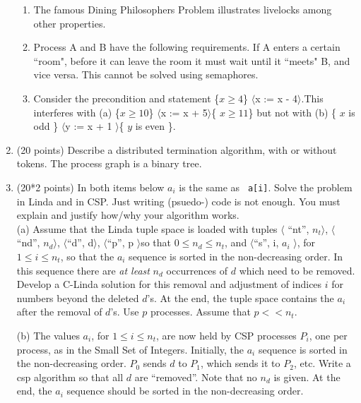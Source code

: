 \documentclass[12pt]{article}
\def\CSP{{\sc csp}}
\def\lb{$\langle$}
\def\rb{$\rangle$}
\begin{document}
\begin{enumerate}
\begin{enumerate}
\item The famous Dining Philosophers Problem illustrates livelocks
among other properties.

\item Process A and B have the following requirements.  If A enters a
certain ``room", before it can leave the room it must wait until it
``meets" B, and vice versa.  This cannot be solved using semaphores.

\item Consider the precondition and statement \{$x \ge 4$\} \lb x
:= x - 4\rb.\quad This interferes with (a) \{$x \ge 10$\} \lb x
:= x + 5\rb \{ $x \ge 11 $\} but not with (b) \{ $x$ is odd \}
\lb y := x + 1 \rb \{ $y$ is even \}.


\end{enumerate}

\item (20 points)
Describe a distributed termination algorithm, with or without tokens.
The process graph is a binary tree.


\item (20*2 points) In both items below $a_i$ is the same as {\tt
a[i]}.  Solve the problem in Linda and in CSP.  Just writing (psuedo-)
code is not enough.  You must explain and justify how/why your
algorithm works.  \\

(a) Assume that the Linda tuple space is loaded with tuples \lb
``nt'', $n_t$\rb, \lb ``nd'', $n_d$\rb, \lb ``d'', d\rb, \lb{}``p'', p
\rb so that $0 \le n_d \le n_t$, and \lb ``s'', i, $a_i$ \rb, for $1
\le i \le n_t$, so that the $a_i$ sequence is sorted in the
non-decreasing order.  In this sequence there are {\em at least} $n_d$
occurrences of $d$ which need to be removed.  Develop a C-Linda
solution for this removal and adjustment of indices $i$ for numbers
beyond the deleted $d$'s.  At the end, the tuple space contains the
$a_i$ after the removal of $d$'s.  Use $p$ processes.  Assume that $p
<< n_t$.

(b) The values $a_i$, for $1 \le i \le n_t$, are now held by CSP
processes $P_i$, one per process, as in the Small Set of Integers.
Initially, the $a_i$ sequence is sorted in the non-decreasing order.
$P_0$ sends $d$ to $P_1$, which sends it to $P_2$, etc.  Write a \CSP
algorithm so that all $d$ are ``removed''.  Note that no $n_d$ is
given.  At the end, the $a_i$ sequence should be sorted in the
non-decreasing order.

\end{enumerate}
\end{document}
